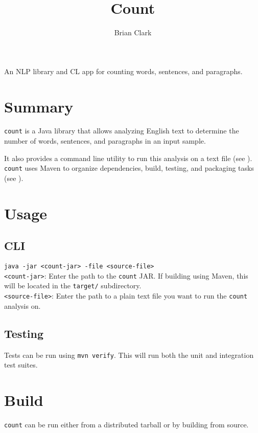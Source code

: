 \documentclass{article}
\begin{document}
\title{Count}
\author{Brian Clark}

\maketitle


An NLP library and CL app for counting words, sentences, and paragraphs.

\tableofcontents
\newpage


\section{Summary}
\texttt{count} is a Java library that allows analyzing English text to determine the number of words, sentences, and paragraphs in an input sample.

It also provides a command line utility to run this analysis on a text file (see ). \texttt{count} uses Maven to organize dependencies, build, testing, and packaging tasks (see ).

\section{Usage}
\label{sec:usage}

\subsection{CLI}

\texttt{java -jar <count-jar> -file <source-file>} \\

\texttt{<count-jar>}: Enter the path to the \texttt{count} JAR. If building using Maven, this will be located in the \texttt{target/} subdirectory. \\

\texttt{<source-file>}: Enter the path to a plain text file you want to run the \texttt{count} analysis on.


\subsection{Testing}
Tests can be run using \texttt{mvn verify}. This will run both the unit and integration test suites.

\section{Build}
\label{sec:build}
\texttt{count} can be run either from a distributed tarball or by building from source.
\end{document}
